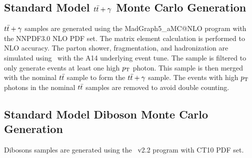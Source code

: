\subsection{Standard Model $t\bar{t}+\gamma$ Monte Carlo Generation}

\indent $t\bar{t}+\gamma$ samples are generated using the {\sc MadGraph5\_aMC\/@NLO} program with the NNPDF3.0 NLO PDF set.\cite{NNPDF3.0} The matrix element calculation is performed to NLO accuracy. The parton shower, fragmentation, and hadronization are simulated using \pythiaeight\ with the A14 underlying event tune.  The sample is filtered to only generate events at least one high $p_{\mathrm{T}}$ photon.  This sample is then merged with the nominal $t\bar{t}$ sample to form the $t\bar{t}+\gamma$ sample.  The events with high $p_{\mathrm{T}}$ photons in the nominal $t\bar{t}$ samples are removed to avoid double counting. \\

\subsection{Standard Model Diboson Monte Carlo Generation}
\label{sec:MC:diboson}

\indent Dibosons samples are generated using the \sherpa~v2.2 program with CT10 PDF set. \\



